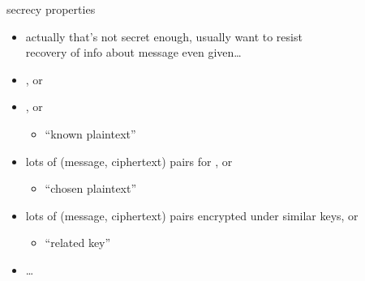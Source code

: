 \begin{frame}{secrecy properties}
    \begin{itemize}
    \item actually that's not secret enough, usually want to resist \\
        recovery of info about message  even given\ldots
    \vspace{.5cm}
    \item {}, or
    \item {}, or
        \begin{itemize}
        \item ``known plaintext''
        \end{itemize}
    \item lots of (message, ciphertext) pairs for \textit{}, or
        \begin{itemize}
        \item ``chosen plaintext''
        \end{itemize}
    \item lots of (message, ciphertext) pairs encrypted under similar keys, or
        \begin{itemize}
        \item ``related key''
        \end{itemize}
    \item \ldots
    \end{itemize}
\end{frame}